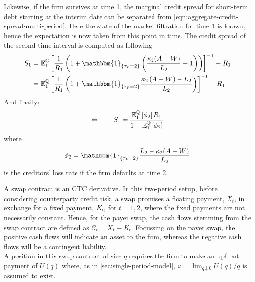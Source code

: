 \documentclass[main.tex]{subfiles}
\begin{document}
        Likewise, if the firm survives at time 1, the marginal credit spread for short-term debt starting at the interim date can be separated from \cref{eqn:aggregate-credit-spread-multi-period}.
        Here the state of the market filtration for time 1 is known, hence the expectation is now taken from this point in time.
        The credit spread of the second time interval is computed as following:
        \begin{align}
            S_1 &=
            \mathbb{E}_{1}^{\rnmeasure}\left[
                \frac{1}{R_1} \left(
                    1
                    + \mathbbm{1}_{\{\tau_{F} = 2\}}\left(
                        \frac{\kappa_2 (A-W)}{L_2} - 1
                    \right)
                \right)
            \right]^{-1} - R_1
            \nonumber
            \\
            &=
            \mathbb{E}_{1}^{\rnmeasure}\left[
                \frac{1}{R_1} \left(
                    1
                    + \mathbbm{1}_{\{\tau_{F} = 2\}}
                    \frac{
                        \kappa_2 \left(A - W\right) - L_2
                    }{
                        L_2
                    }
                \right)
            \right]^{-1} - R_1
            \nonumber
        \end{align}
        And finally:
        \begin{equation}
            \Leftrightarrow \qquad
            S_1 =
            \frac{
                \mathbb{E}_{1}^{\mathbb{Q}}\left[\phi_2\right]R_1
            }{
                1 - \mathbb{E}_{1}^{\mathbb{Q}}\left[\phi_2\right] 
            }
        \end{equation}
        where
        \begin{equation}
            \phi_2 =
            \mathbbm{1}_{\{\tau_{F}=2\}}
            \frac{
                L_{2}-\kappa_{2}(A-W)
            }{
                L_{2}
            }
        \end{equation}
        is the creditors' loss rate if the firm defaults at time 2.

        A swap contract is an OTC derivative.
        In this two-period setup, before considering counterparty credit risk, a swap promises a floating payment, $X_t$, in exchange for a fixed payment, $K_t$, for $t = 1,2$, where the fixed payments are not necessarily constant.
        Hence, for the payer swap, the cash flows stemming from the swap contract are defined as $\mathcal{C}_t = X_t - K_t$.
        Focussing on the payer swap, the positive cash flows will indicate an asset to the firm, whereas the negative cash flows will be a contingent liability.
        \\
        A position in this swap contract of size $q$ requires the firm to make an upfront payment of $U(q)$ where, as in \cref{sec:single-period-model}, $u = \lim_{q \downarrow 0} U(q)/q$ is assumed to exist.
\end{document}
